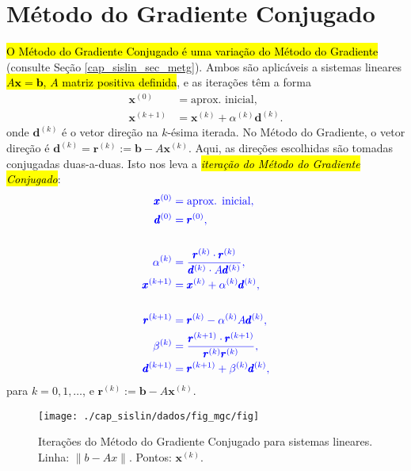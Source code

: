 
\section{Método do Gradiente Conjugado}\label{cap_sislin_sec_metgc}

\hl{O Método do Gradiente Conjugado é uma variação do Método do Gradiente} (consulte Seção \ref{cap_sislin_sec_metg}). Ambos são aplicáveis a sistemas lineares \hl{$A\pmb{x} = \pmb{b}$, $A$ matriz positiva definida}, e as iterações têm a forma
\begin{align}
  \pmb{x}^{(0)} &= \text{aprox. inicial},\\
  \pmb{x}^{(k+1)} &= \pmb{x}^{(k)} + \alpha^{(k)}\pmb{d}^{(k)}.
\end{align}
onde $\pmb{d}^{(k)}$ é o vetor direção na $k$-ésima iterada. No Método do Gradiente, o vetor direção é $\pmb{d}^{(k)} = \pmb{r}^{(k)}:= \pmb{b} - A\pmb{x}^{(k)}$. Aqui, as direções escolhidas são tomadas conjugadas duas-a-duas. Isto nos leva a \hl{\emph{iteração do Método do Gradiente Conjugado}}:
\begin{align}
  \color{blue}\pmb{x}^{(0)} &\color{blue}= \text{aprox. inicial},\\
  \color{blue}\pmb{d}^{(0)} &\color{blue}= \pmb{r}^{(0)},\\
  &\nonumber\\
  \color{blue}\alpha^{(k)} &\color{blue}= \frac{\pmb{r}^{(k)}\cdot \pmb{r}^{(k)}}{\pmb{d}^{(k)}\cdot A\pmb{d}^{(k)}},\\
  \color{blue}\pmb{x}^{(k+1)} &\color{blue}= \pmb{x}^{(k)} + \alpha^{(k)}\pmb{d}^{(k)},\\
  &\nonumber\\
  \color{blue}\pmb{r}^{(k+1)} &\color{blue}= \pmb{r}^{(k)} - \alpha^{(k)}A\pmb{d}^{(k)},\\
  \color{blue}\beta^{(k)} &\color{blue}= \frac{\pmb{r}^{(k+1)}\cdot \pmb{r}^{(k+1)}}{\pmb{r}^{(k)}\pmb{r}^{(k)}},\\
  \color{blue}\pmb{d}^{(k+1)} &\color{blue}= \pmb{r}^{(k+1)}+\beta^{(k)}\pmb{d}^{(k)},\\
\end{align}
para $k = 0, 1, \ldots$, e $\pmb{r}^{(k)} := \pmb{b} - A\pmb{x}^{(k)}$.

\begin{figure}[H]
  \centering
  \texttt{[image: ./cap\_sislin/dados/fig\_mgc/fig]}
  \caption{Iterações do Método do Gradiente Conjugado para sistemas lineares. Linha: $\|b-Ax\|$. Pontos: $\pmb{x}^{(k)}$.}
  \label{cap_sislin_sec_metgc:fig:cap_sislin_sec_mgc}
\end{figure}

